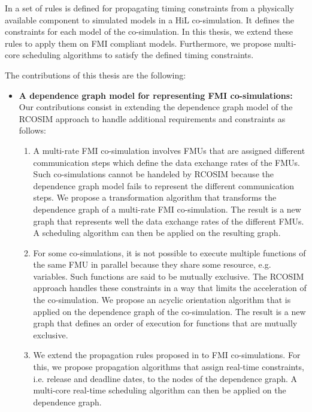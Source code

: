 In \cite{faure:2011} a set of rules is defined for propagating timing constraints from a physically available component to simulated models in a HiL co-simulation. It defines the constraints for each model of the co-simulation. In this thesis, we extend these rules to apply them on FMI compliant models. Furthermore, we propose multi-core scheduling algorithms to satisfy the defined timing constraints.

The contributions of this thesis are the following:

\begin{itemize}

\item \textbf{A dependence graph model for representing FMI co-simulations:} Our contributions consist in extending the dependence graph model of the RCOSIM approach to handle additional requirements and constraints as follows:

\begin{enumerate}

\item A multi-rate FMI co-simulation involves FMUs that are assigned different communication steps which define the data exchange rates of the FMUs. Such co-simulations cannot be handeled by RCOSIM because the dependence graph model fails to represent the different communication steps. We propose a transformation algorithm that transforms the dependence graph of a multi-rate FMI co-simulation. The result is a new graph that represents well the data exchange rates of the different FMUs. A scheduling algorithm can then be applied on the resulting graph.

\item For some co-simulations, it is not possible to execute multiple functions of the same FMU in parallel because they share some resource, e.g. variables. Such functions are said to be mutually exclusive. The RCOSIM approach handles these constraints in a way that limits the acceleration of the co-simulation. We propose an acyclic orientation algorithm that is applied on the dependence graph of the co-simulation. The result is a new graph that defines an order of execution for functions that are mutually exclusive.

\item We extend the propagation rules proposed in \cite{faure:2011} to FMI co-simulations. For this, we propose propagation algorithms that assign real-time constraints, i.e. release and deadline dates, to the nodes of the dependence graph. A multi-core real-time scheduling algorithm can then be applied on the dependence graph.


\end{enumerate}
\end{itemize}
